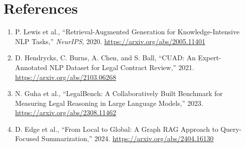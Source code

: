 \documentclass[11pt,letterpaper]{article}
\begin{document}
\section{References}
\begin{enumerate}
  \item P. Lewis et al., ``Retrieval-Augmented Generation for Knowledge-Intensive NLP Tasks,'' \textit{NeurIPS}, 2020. \url{https://arxiv.org/abs/2005.11401}
  \item D. Hendrycks, C. Burns, A. Chen, and S. Ball, ``CUAD: An Expert-Annotated NLP Dataset for Legal Contract Review,'' 2021. \url{https://arxiv.org/abs/2103.06268}
  \item N. Guha et al., ``LegalBench: A Collaboratively Built Benchmark for Measuring Legal Reasoning in Large Language Models,'' 2023. \url{https://arxiv.org/abs/2308.11462}
  \item D. Edge et al., ``From Local to Global: A Graph RAG Approach to Query-Focused Summarization,'' 2024. \url{https://arxiv.org/abs/2404.16130}
\end{enumerate}
\end{document}
